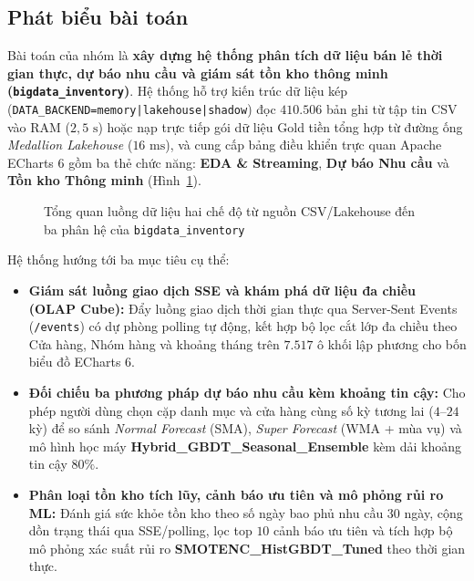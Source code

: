 \subsection{Phát biểu bài toán}
\label{sec:problem}
Bài toán của nhóm là \textbf{xây dựng hệ thống phân tích dữ liệu bán lẻ thời gian thực, dự báo nhu cầu và giám sát tồn kho thông minh (\texttt{bigdata_inventory})}. Hệ thống hỗ trợ kiến trúc dữ liệu kép (\texttt{DATA_BACKEND=memory|lakehouse|shadow}) đọc $410.506$ bản ghi từ tập tin CSV vào RAM ($2{,}5\text{ s}$) hoặc nạp trực tiếp gói dữ liệu Gold tiền tổng hợp từ đường ống \textit{Medallion Lakehouse} ($16\text{ ms}$), và cung cấp bảng điều khiển trực quan Apache ECharts 6 gồm ba thẻ chức năng: \textbf{EDA \& Streaming}, \textbf{Dự báo Nhu cầu} và \textbf{Tồn kho Thông minh} (Hình~\ref{fig:system_overview}).

\begin{figure}[H]
	\centering
	\caption{Tổng quan luồng dữ liệu hai chế độ từ nguồn CSV/Lakehouse đến ba phân hệ của \texttt{bigdata\_inventory}}
	\label{fig:system_overview}
\end{figure}

\medskip

Hệ thống hướng tới ba mục tiêu cụ thể:
\begin{itemize}[topsep=0pt, itemsep=1pt]
	\item \textbf{Giám sát luồng giao dịch SSE và khám phá dữ liệu đa chiều (OLAP Cube):} Đẩy luồng giao dịch thời gian thực qua Server-Sent Events (\texttt{/events}) có dự phòng polling tự động, kết hợp bộ lọc cắt lớp đa chiều theo Cửa hàng, Nhóm hàng và khoảng tháng trên $7.517$ ô khối lập phương cho bốn biểu đồ ECharts 6.
	\item \textbf{Đối chiếu ba phương pháp dự báo nhu cầu kèm khoảng tin cậy:} Cho phép người dùng chọn cặp danh mục và cửa hàng cùng số kỳ tương lai ($4$--$24$ kỳ) để so sánh \textit{Normal Forecast} (SMA), \textit{Super Forecast} (WMA + mùa vụ) và mô hình học máy \textbf{Hybrid\_GBDT\_Seasonal\_Ensemble} kèm dải khoảng tin cậy $80\%$.
	\item \textbf{Phân loại tồn kho tích lũy, cảnh báo ưu tiên và mô phỏng rủi ro ML:} Đánh giá sức khỏe tồn kho theo số ngày bao phủ nhu cầu $30$ ngày, cộng dồn trạng thái qua SSE/polling, lọc top $10$ cảnh báo ưu tiên và tích hợp bộ mô phỏng xác suất rủi ro \textbf{SMOTENC\_HistGBDT\_Tuned} theo thời gian thực.
\end{itemize}

